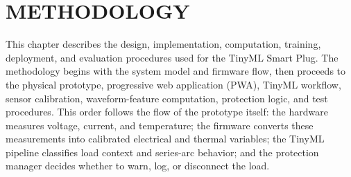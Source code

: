 \chapter{METHODOLOGY}
\label{chap:methodology}

This chapter describes the design, implementation, computation, training,
deployment, and evaluation procedures used for the TinyML Smart Plug. The
methodology begins with the system model and firmware flow, then proceeds to
the physical prototype, progressive web application (PWA), TinyML workflow,
sensor calibration, waveform-feature computation, protection logic, and test
procedures. This order follows the flow of the prototype itself: the hardware
measures voltage, current, and temperature; the firmware converts these
measurements into calibrated electrical and thermal variables; the TinyML
pipeline classifies load context and series-arc behavior; and the protection
manager decides whether to warn, log, or disconnect the load.










